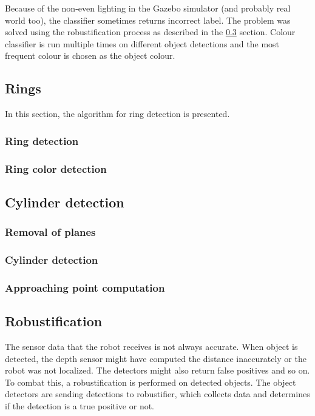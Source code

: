 \documentclass[12pt,a4paper]{article}
\begin{document}
	Because of the non-even lighting in the Gazebo simulator (and probably real world too), the classifier sometimes returns incorrect label. The problem was solved using the robustification process as described in the \ref{robustification} section. Colour classifier is run multiple times on different object detections and the most frequent colour is chosen as the object colour. \\
	
	\subsection{Rings}
	In this section, the algorithm for ring detection is presented.
	
	\subsubsection{Ring detection}	
	\subsubsection{Ring color detection}
	
	\subsection{Cylinder detection}
	\subsubsection{Removal of planes}
	\subsubsection{Cylinder detection}
	\subsubsection{Approaching point computation}
	
	\subsection{Robustification} \label{robustification}
	The sensor data that the robot receives is not always accurate. When object is detected, the depth sensor might have computed the distance inaccurately or the robot was not localized. The detectors might also return false positives and so on. \\
	
	To combat this, a robustification is performed on detected objects. The object detectors are sending detections to robustifier, which collects data and determines if the detection is a true positive or not. \\
	
\end{document}

